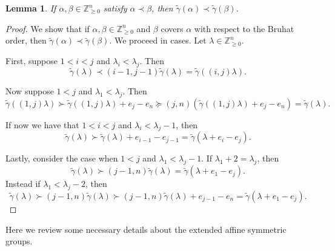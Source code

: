 \documentclass[pdftex]{sigma}
\numberwithin{equation}{section}
\newtheorem{Lemma}[Theorem]{Lemma}
\theoremstyle{definition}
\begin{document}
\begin{Lemma}\label{gamma preserves Bruhat}
 If $\alpha, \beta \in \mathbb{Z}^n_{\geq 0}$ satisfy $\alpha \prec \beta$, then $\widetilde{\gamma}(\alpha) \prec \widetilde{\gamma}(\beta)$.
\end{Lemma}
\begin{proof}
 We show that if $\alpha, \beta \in \mathbb{Z}_{\geq 0}^{n}$ and $\beta$ covers $\alpha$ with respect to the Bruhat order, then $\widetilde{\gamma}(\alpha) \prec \widetilde{\gamma}(\beta)$. We proceed in cases. Let $\lambda \in \mathbb{Z}_{\geq 0}^{n}$.

 First, suppose $1<i<j$ and $\lambda_i < \lambda_j$. Then
\[\widetilde{\gamma}(\lambda) \prec (i-1,j-1)\widetilde{\gamma}(\lambda) = \widetilde{\gamma}( (i,j) \lambda).\]

 Now suppose $1<j$ and $\lambda_1 < \lambda_j$. Then
 \[
 \widetilde{\gamma}( (1,j)\lambda) \succ \widetilde{\gamma}( (1,j)\lambda) + e_j - e_n \succeq (j,n)(\widetilde{\gamma}( (1,j)\lambda) + e_j - e_n) = \widetilde{\gamma}(\lambda).
 \]


 If now we have that $1<i<j$ and $\lambda_i < \lambda_j -1$, then
 \[
 \widetilde{\gamma}(\lambda) \succ \widetilde{\gamma}(\lambda) + e_{i-1}-e_{j-1} = \widetilde{\gamma}(\lambda + e_{i}-e_{j}).
 \]

 Lastly, consider the case when $1 < j$ and $\lambda_1 < \lambda_j -1$. If $\lambda_1 + 2 = \lambda_j$, then
 \[
 \widetilde{\gamma}(\lambda) \succ (j-1,n)\widetilde{\gamma}(\lambda) = \widetilde{\gamma}(\lambda + e_1 - e_j).
 \]
 Instead if $\lambda_1 < \lambda_j -2$, then
 \[
 \widetilde{\gamma}(\lambda) \succ (j-1,n)\widetilde{\gamma}(\lambda) \succ (j-1,n) \widetilde{\gamma}(\lambda) + e_{j-1}-e_n = \widetilde{\gamma}(\lambda+e_1-e_j).\tag*{\qed}
 \] \renewcommand{\qed}{}
\end{proof}

Here we review some necessary details about the extended affine symmetric groups.
\end{document}
